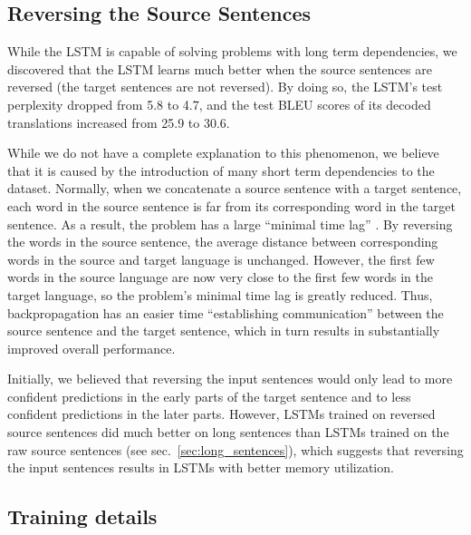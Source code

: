 \documentclass{article} \usepackage{nips14submit_e}
\begin{document}
\subsection{Reversing the Source Sentences}
\label{sec:rev_rev}

While the LSTM is capable of solving problems with long term
dependencies, we discovered that the LSTM learns much better when the
source sentences are reversed (the target sentences are not reversed).  By
doing so, the LSTM's test perplexity dropped from 5.8 to 4.7, and the 
test BLEU scores of its decoded translations increased from 25.9 to 30.6.



While we do not have a complete explanation to this phenomenon, we
believe that it is caused by the introduction of many short term
dependencies to the dataset.  Normally, when we concatenate a source
sentence with a target sentence, each word in the source sentence is
far from its corresponding word in the target sentence. As a result,
the problem has a large ``minimal time lag'' \cite{minimal_time_lag}.  By reversing the
words in the source sentence, the average distance between
corresponding words in the source and target language is unchanged.
However, the first few words in the source language are now very close to
the first few words in the target language, so the problem's minimal
time lag is greatly reduced. Thus, backpropagation has an easier time
``establishing communication'' between the source sentence and the
target sentence, which in turn results in substantially improved overall
 performance.

Initially, we believed that reversing the input sentences would 
only lead to more confident predictions in the early parts of the target
sentence and to less confident predictions in the later parts.
However, LSTMs trained on reversed source sentences did much better on
long sentences than LSTMs trained on the raw source sentences (see
sec.~\ref{sec:long_sentences}), which suggests that reversing the
input sentences results in LSTMs with better memory utilization. 









\subsection{Training details}
\end{document}

